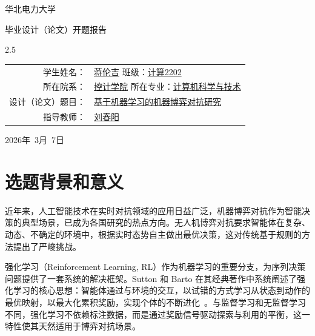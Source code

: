 \documentclass[12pt,a4paper,UTF8]{ctexart}
\title{}
\author{}
\date{}
\numberwithin{equation}{section}
\begin{document}
\pagestyle{empty}  %

\begin{center}
    {\heiti 华\quad 北\quad 电\quad 力\quad 大\quad 学}

    \vspace{2em}
    {\heiti 毕业设计（论文）开题报告}

    \vspace{6em}

    \begin{spacing}{2.5}
        {\songti
        \begin{tabular}{rl}
            学生姓名： & \uline{蒋伦吉} \hspace{2em} 班级：\uline{计算2202} \\
            所在院系： & \uline{控计学院} \hspace{2em} 所在专业：\uline{计算机科学与技术} \\
            设计（论文）题目： & \uline{基于机器学习的机器博弈对抗研究} \\
            指导教师： & \uline{刘春阳} \\
        \end{tabular}
        }
    \end{spacing}

    \vspace{6em}

    {\songti 2026年~3月~7日}
\end{center}

\newpage

\section{选题背景和意义}

近年来，人工智能技术在实时对抗领域的应用日益广泛，机器博弈对抗作为智能决策的典型场景，已成为各国研究的热点方向。无人机博弈对抗要求智能体在复杂、动态、不确定的环境中，根据实时态势自主做出最优决策，这对传统基于规则的方法提出了严峻挑战。

强化学习（Reinforcement Learning, RL）作为机器学习的重要分支，为序列决策问题提供了一套系统的解决框架。Sutton 和 Barto 在其经典著作中系统阐述了强化学习的核心思想：智能体通过与环境的交互，以试错的方式学习从状态到动作的最优映射，以最大化累积奖励，实现个体的不断进化~\cite{sutton2018reinforcement}。与监督学习和无监督学习不同，强化学习不依赖标注数据，而是通过奖励信号驱动探索与利用的平衡，这一特性使其天然适用于博弈对抗场景。
\end{document}
